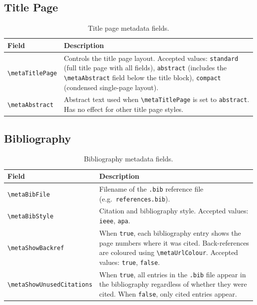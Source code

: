 \subsection{Title Page}

\begin{table}[H]
	\centering
	\caption{Title page metadata fields.}
	\label{tab:meta-titlepage}
	\begin{tabularx}{\linewidth}{@{}lX@{}}
		\toprule
		Field & Description \\
		\midrule
		\texttt{\textbackslash metaTitlePage} & Controls the title page layout. Accepted values: \texttt{standard} (full title page with all fields), \texttt{abstract} (includes the \texttt{\textbackslash metaAbstract} field below the title block), \texttt{compact} (condensed single-page layout). \\
		\texttt{\textbackslash metaAbstract}  & Abstract text used when \texttt{\textbackslash metaTitlePage} is set to \texttt{abstract}. Has no effect for other title page styles. \\
		\bottomrule
	\end{tabularx}
\end{table}

\subsection{Bibliography}

\begin{table}[H]
	\centering
	\caption{Bibliography metadata fields.}
	\label{tab:meta-bib}
	\begin{tabularx}{\linewidth}{@{}lX@{}}
		\toprule
		Field & Description \\
		\midrule
		\texttt{\textbackslash metaBibFile}             & Filename of the \texttt{.bib} reference file (e.g.\ \texttt{references.bib}). \\
		\texttt{\textbackslash metaBibStyle}            & Citation and bibliography style. Accepted values: \texttt{ieee}, \texttt{apa}. \\
		\texttt{\textbackslash metaShowBackref}         & When \texttt{true}, each bibliography entry shows the page numbers where it was cited. Back-references are coloured using \texttt{\textbackslash metaUrlColour}. Accepted values: \texttt{true}, \texttt{false}. \\
		\texttt{\textbackslash metaShowUnusedCitations} & When \texttt{true}, all entries in the \texttt{.bib} file appear in the bibliography regardless of whether they were cited. When \texttt{false}, only cited entries appear. \\
		\bottomrule
	\end{tabularx}
\end{table}


